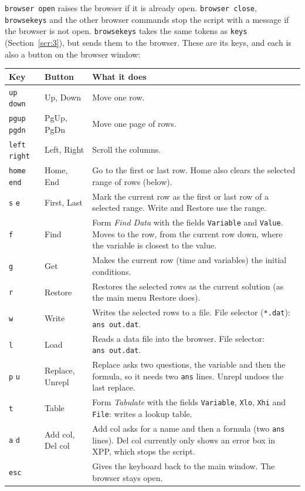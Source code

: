 \documentclass{article}
\begin{document}
\texttt{browser\ open} raises the browser if it is already open.
\texttt{browser\ close}, \texttt{browsekeys} and the other
browser commands stop the script with a message if the browser is not
open. \texttt{browsekeys} takes the same tokens as \texttt{keys}
(Section~\ref{scr:3}), but sends them to the browser. These are its keys, and each
is also a button on the browser window:

\begin{longtable}[]{@{}p{}p{}p{}@{}}
\toprule\noalign{}
Key & Button & What it does \\
\midrule\noalign{}
\endhead
\bottomrule\noalign{}
\endlastfoot
\texttt{up} \texttt{down} & Up, Down & Move one row. \\
\texttt{pgup} \texttt{pgdn} & PgUp, PgDn & Move one page of rows. \\
\texttt{left} \texttt{right} & Left, Right & Scroll the columns. \\
\texttt{home} \texttt{end} & Home, End & Go to the first or last row. Home also clears the selected range of
rows (below). \\
\texttt{s} \texttt{e} & First, Last & Mark the current row as the first or last row of a selected range.
Write and Restore use the range. \\
\texttt{f} & Find & Form \emph{Find Data} with the fields \texttt{Variable} and
\texttt{Value}. Moves to the row, from the current row down, where
the variable is closest to the value. \\
\texttt{g} & Get & Makes the current row (time and variables) the initial
conditions. \\
\texttt{r} & Restore & Restores the selected rows as the current solution (as the main menu
Restore does). \\
\texttt{w} & Write & Writes the selected rows to a file. File selector
(\texttt{*.dat}): \texttt{ans\ out.dat}. \\
\texttt{l} & Load & Reads a data file into the browser. File selector:
\texttt{ans\ out.dat}. \\
\texttt{p} \texttt{u} & Replace, Unrepl & Replace asks two questions, the variable and then the formula, so it
needs two \texttt{ans} lines. Unrepl undoes the last replace. \\
\texttt{t} & Table & Form \emph{Tabulate} with the fields \texttt{Variable},
\texttt{Xlo}, \texttt{Xhi} and \texttt{File}: writes a lookup
table. \\
\texttt{a} \texttt{d} & Add col, Del col & Add col asks for a name and then a formula (two \texttt{ans}
lines). Del col currently only shows an error box in XPP, which stops
the script. \\
\texttt{esc} & & Gives the keyboard back to the main window. The browser stays
open. \\
\end{longtable}
\end{document}
